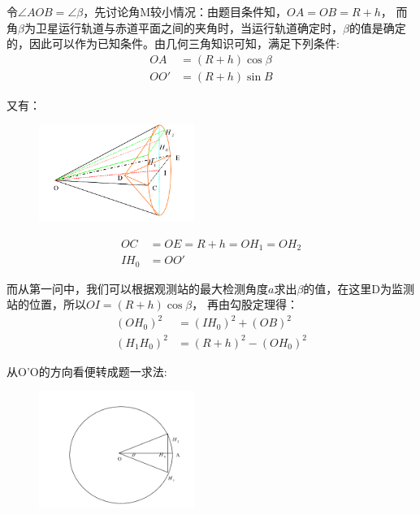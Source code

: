 \documentclass[UTF8]{ctexart}
\begin{document}
        \par 令$\angle AOB=\angle \beta$，先讨论角M较小情况：由题目条件知，$OA=OB=R+h$， 而角$\beta$为卫星运行轨道与赤道平面之间的夹角时，当运行轨道确定时，$\beta$的值是确定的，因此可以作为已知条件。由几何三角知识可知，满足下列条件:
        \begin{align}
            OA &=(R+h) \cos \beta\\
            OO'&=(R+h) \sin B
        \end{align}
        \par 又有：
        \begin{figure}[!htbp]
            \centering
            \includegraphics*[width=0.45\textwidth]{第二问3}
        \end{figure}
        \begin{align}
            OC&=OE=R+h=OH_1=OH_2\\
            IH_0&=OO'
        \end{align}
        \par 而从第一问中，我们可以根据观测站的最大检测角度$a$求出$\beta $的值，在这里D为监测站的位置，所以$OI=(R+h)\cos \beta$，
             再由勾股定理得：
        \begin{align}
            (OH_0)^2 & =(IH_0)^2+(OB)^2\\
            (H_1H_0)^2 & =(R+h)^2-(OH_0)^2
        \end{align}
        \par 从O'O的方向看便转成题一求法:
        \begin{figure}
            \centering
            \includegraphics*[width=0.45\textwidth]{第二问4}
        \end{figure}
\end{document}
